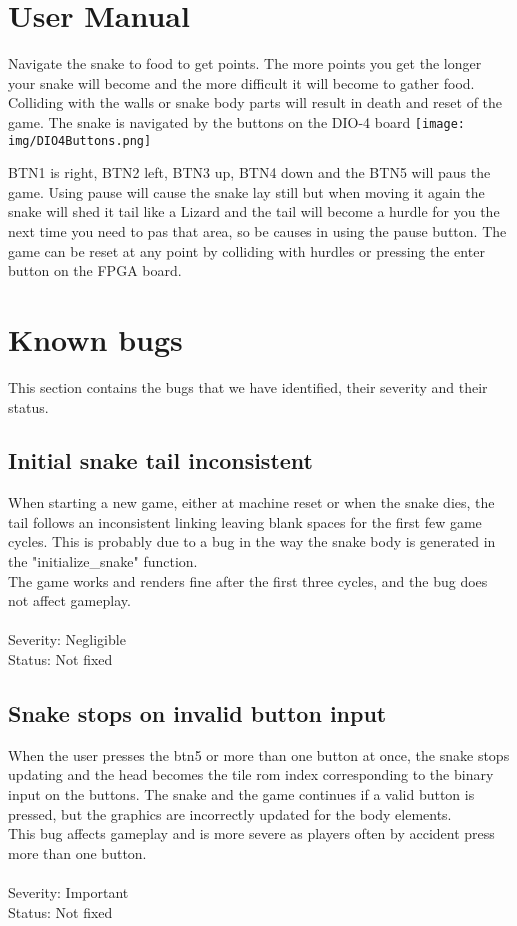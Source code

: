 \documentclass{acm_proc_article-sp}
\begin{document}
\section{User Manual}
Navigate the snake to food to get points. The more points you get the longer your snake will become and the more difficult it will become to gather food.
Colliding with the walls or snake body parts will result in death and reset of the game. The snake is navigated by the buttons on the DIO-4 board 
\texttt{[image: img/DIO4Buttons.png]} 

BTN1 is right, BTN2 left, BTN3 up, BTN4 down and the BTN5 will paus the game. Using pause will cause the snake lay still but when moving it again the snake will shed it tail like a Lizard and the tail will become a hurdle for you the next time you need to pas that area, so be causes in using the pause button.
The game can be reset at any point by colliding with hurdles or pressing the enter button on the FPGA board.

\section{Known bugs}
This section contains the bugs that we have identified, their severity and their status.
\subsection{Initial snake tail inconsistent}
When starting a new game, either at machine reset or when the snake dies, the tail follows an inconsistent linking leaving blank spaces for the first few game cycles. This is probably due to a bug in the way the snake body is generated in the "initialize\_snake" function.\\
The game works and renders fine after the first three cycles, and the bug does not affect gameplay.\\\\
Severity: Negligible\\
Status: Not fixed

\subsection{Snake stops on invalid button input}
When the user presses the btn5 or more than one button at once, the snake stops updating and the head becomes the tile rom index corresponding to the binary input on the buttons. The snake and the game continues if a valid button is pressed, but the graphics are incorrectly updated for the body elements.\\
This bug affects gameplay and is more severe as players often by accident press more than one button.\\\\
Severity: Important\\
Status: Not fixed
\end{document}
